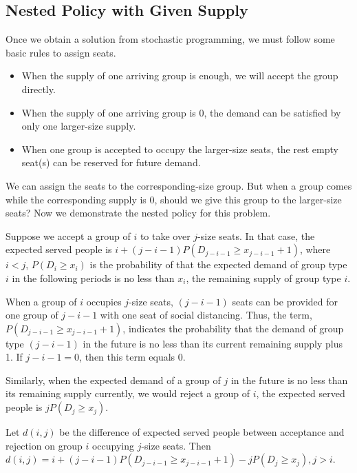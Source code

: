 \subsection{Nested Policy with Given Supply}\label{nested_policy}

Once we obtain a solution from stochastic programming, we must follow some basic rules to assign seats.
\begin{itemize}
    \item When the supply of one arriving group is enough, we will accept the group directly.
    \item When the supply of one arriving group is 0, the demand can be satisfied by only one larger-size supply.
    \item When one group is accepted to occupy the larger-size seats, the rest empty seat(s) can be reserved for future demand.
\end{itemize}

We can assign the seats to the corresponding-size group. But when a group comes while the corresponding supply is 0, should we give this group to the larger-size seats? Now we demonstrate the nested policy for this problem.

Suppose we accept a group of $i$ to take over $j$-size seats. In that case, the expected served people is $i + (j-i-1)P(D_{j-i-1} \geq x_{j-i-1}+1)$, where $i < j$, $P(D_i \geq x_i)$ is the probability of that the expected demand of group type $i$ in the following periods is no less than $x_i$, the remaining supply of group type $i$.

When a group of $i$ occupies $j$-size seats, $(j-i-1)$ seats can be provided for one group of $j-i-1$ with one seat of social distancing.
Thus, the term, $P(D_{j-i-1} \geq x_{j-i-1}+1)$, indicates the probability that the demand of group type $(j-i-1)$ in the future is no less than its current remaining supply plus 1. If $j -i-1 =0$, then this term equals 0.

Similarly, when the expected demand of a group of $j$ in the future is no less than its remaining supply currently, we would reject a group of $i$, the expected served people is $j P(D_{j} \geq x_{j})$.

Let $d(i,j)$ be the difference of expected served people between acceptance and rejection on group $i$ occupying $j$-size seats. Then $d(i,j) = i + (j-i-1)P(D_{j-i-1} \geq x_{j-i-1}+1) - j P(D_{j} \geq x_{j}), j >i$.

